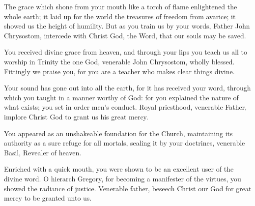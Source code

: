 \trisagion




The grace which shone from your mouth like a torch of flame enlightened the whole earth; it laid up for the world the treasures of freedom from avarice; it showed us the height of humility. But as you train us by your words, Father John Chrysostom, intercede with Christ God, the Word, that our souls may be saved.



You received divine grace from heaven, and through your lips you teach us all to worship in Trinity the one God, venerable John Chrysostom, wholly blessed. Fittingly we praise you, for you are a teacher who makes clear things divine.




Your sound has gone out into all the earth, for it has received your word, through which you taught in a manner worthy of God: for you explained the nature of what exists; you set in order men's conduct. Royal priesthood, venerable Father, implore Christ God to grant us his great mercy.



You appeared as an unshakeable foundation for the Church, maintaining its authority as a sure refuge for all mortals, sealing it by your doctrines, venerable Basil, Revealer of heaven.




Enriched with a quick mouth, you were shown to be an excellent user of the divine word. O hierarch Gregory, for becoming a manifester of the virtues, you showed the radiance of justice. Venerable father, beseech Christ our God for great mercy to be granted unto us.

